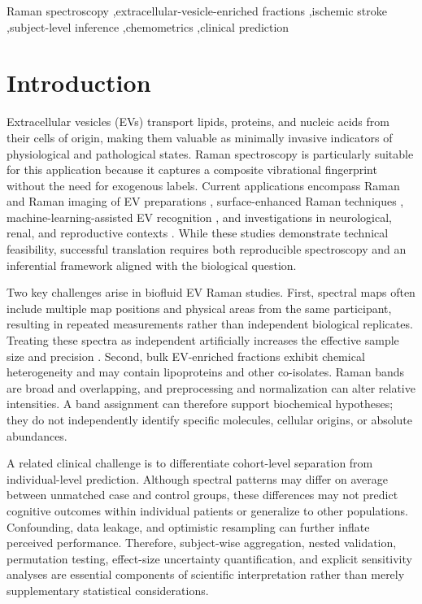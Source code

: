 \documentclass[preprint,12pt]{elsarticle}
\begin{document}
\begin{frontmatter}
\begin{abstract}
 
\end{abstract}

\begin{keyword} Raman spectroscopy \sep extracellular-vesicle-enriched fractions \sep ischemic stroke \sep subject-level inference \sep chemometrics \sep clinical prediction \end{keyword}

\end{frontmatter}

\section{Introduction} 
\label{sec:introduction}

Extracellular vesicles (EVs) transport lipids, proteins, and nucleic acids from their cells of origin, making them valuable as minimally invasive indicators of physiological and pathological states. Raman spectroscopy is particularly suitable for this application because it captures a composite vibrational fingerprint without the need for exogenous labels. Current applications encompass Raman and Raman imaging of EV preparations \cite{horgan2020,liu2025}, surface-enhanced Raman techniques \cite{koster2021}, machine-learning-assisted EV recognition \cite{jensen2024,lee2020}, and investigations in neurological, renal, and reproductive contexts \cite{imanbekova2021,kaminska2022,zhang2020}. While these studies demonstrate technical feasibility, successful translation requires both reproducible spectroscopy and an inferential framework aligned with the biological question.

Two key challenges arise in biofluid EV Raman studies. First, spectral maps often include multiple map positions and physical areas from the same participant, resulting in repeated measurements rather than independent biological replicates. Treating these spectra as independent artificially increases the effective sample size and precision \cite{hurlbert1984,lazic2010}. Second, bulk EV-enriched fractions exhibit chemical heterogeneity and may contain lipoproteins and other co-isolates. Raman bands are broad and overlapping, and preprocessing and normalization can alter relative intensities. A band assignment can therefore support biochemical hypotheses; they do not independently identify specific molecules, cellular origins, or absolute abundances.

A related clinical challenge is to differentiate cohort-level separation from individual-level prediction. Although spectral patterns may differ on average between unmatched case and control groups, these differences may not predict cognitive outcomes within individual patients or generalize to other populations. Confounding, data leakage, and optimistic resampling can further inflate perceived performance. Therefore, subject-wise aggregation, nested validation, permutation testing, effect-size uncertainty quantification, and explicit sensitivity analyses are essential components of scientific interpretation rather than merely supplementary statistical considerations.
\end{document}
